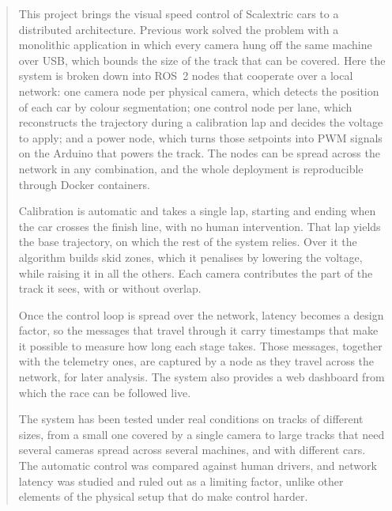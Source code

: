 \begin{abstract}
  \vspace*{25pt}
  \begin{segundoresumo}
    This project brings the visual speed control of Scalextric cars to a distributed
    architecture. Previous work solved the problem with a monolithic application in which every
    camera hung off the same machine over USB, which bounds the size of the track that can be
    covered. Here the system is broken down into ROS~2 nodes that cooperate over a local
    network: one camera node per physical camera, which detects the position of each car by
    colour segmentation; one control node per lane, which reconstructs the trajectory during a
    calibration lap and decides the voltage to apply; and a power node, which turns those
    setpoints into PWM signals on the Arduino that powers the track. The nodes can be spread
    across the network in any combination, and the whole deployment is reproducible through
    Docker containers.

    Calibration is automatic and takes a single lap, starting and ending when the car crosses
    the finish line, with no human intervention. That lap yields the base trajectory, on which
    the rest of the system relies. Over it the algorithm builds skid zones, which it penalises
    by lowering the voltage, while raising it in all the others. Each camera contributes the
    part of the track it sees, with or without overlap.

    Once the control loop is spread over the network, latency becomes a design factor, so the
    messages that travel through it carry timestamps that make it possible to measure how long
    each stage takes. Those messages, together with the telemetry ones, are captured by a node
    as they travel across the network, for later analysis. The system also provides a web
    dashboard from which the race can be followed live.

    The system has been tested under real conditions on tracks of different sizes, from a small
    one covered by a single camera to large tracks that need several cameras spread across
    several machines, and with different cars. The automatic control was compared against human
    drivers, and network latency was studied and ruled out as a limiting factor, unlike other
    elements of the physical setup that do make control harder.
  \end{segundoresumo}
\vspace*{25pt}

\end{abstract}
\pagestyle{fancy}

